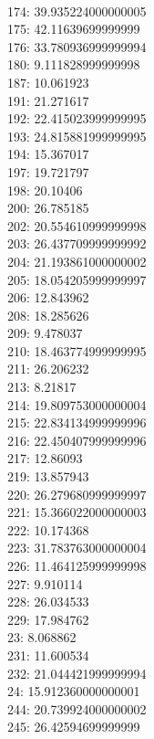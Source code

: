 \begin{multicols}{4}
  \\ 174: 39.935224000000005
  \\ 175: 42.11639699999999
  \\ 176: 33.780936999999994
  \\ 180: 9.111828999999998
  \\ 187: 10.061923
  \\ 191: 21.271617
  \\ 192: 22.415023999999995
  \\ 193: 24.815881999999995
  \\ 194: 15.367017
  \\ 197: 19.721797
  \\ 198: 20.10406
  \\ 200: 26.785185
  \\ 202: 20.554610999999998
  \\ 203: 26.437709999999992
  \\ 204: 21.193861000000002
  \\ 205: 18.054205999999997
  \\ 206: 12.843962
  \\ 208: 18.285626
  \\ 209: 9.478037
  \\ 210: 18.463774999999995
  \\ 211: 26.206232
  \\ 213: 8.21817
  \\ 214: 19.809753000000004
  \\ 215: 22.834134999999996
  \\ 216: 22.450407999999996
  \\ 217: 12.86093
  \\ 219: 13.857943
  \\ 220: 26.279680999999997
  \\ 221: 15.366022000000003
  \\ 222: 10.174368
  \\ 223: 31.783763000000004
  \\ 226: 11.464125999999998
  \\ 227: 9.910114
  \\ 228: 26.034533
  \\ 229: 17.984762
  \\ 23: 8.068862
  \\ 231: 11.600534
  \\ 232: 21.044421999999994
  \\ 24: 15.912360000000001
  \\ 244: 20.739924000000002
  \\ 245: 26.42594699999999

\end{multicols}
